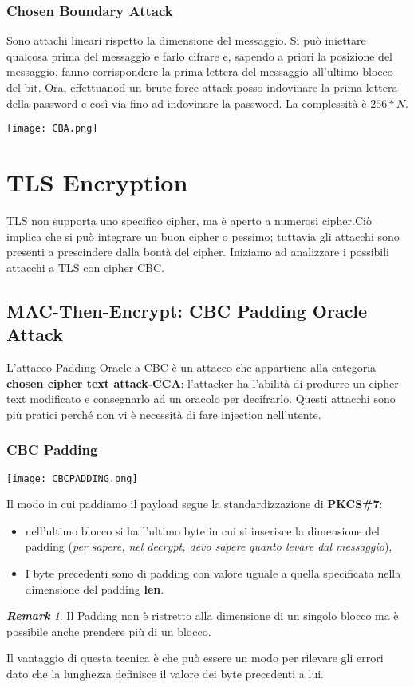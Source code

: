 \documentclass{article}
\theoremstyle{remark}
\newtheorem*{remark}{\textbf{Remark}}
\begin{document}
\subsubsection{Chosen Boundary Attack}
Sono attachi lineari rispetto la dimensione del messaggio. Si può iniettare qualcosa prima del messaggio e farlo cifrare e, sapendo a priori la posizione del messaggio, fanno corrispondere la prima lettera del messaggio all'ultimo blocco del bit. Ora, effettuanod un brute force attack posso indovinare la prima lettera della password e così via fino ad indovinare la password. La complessità è $256*N$.
\begin{center}
	\texttt{[image: CBA.png]}
\end{center}
\section{TLS Encryption}
TLS non supporta uno specifico cipher, ma è aperto a numerosi cipher.Ciò implica che si può integrare un buon cipher o pessimo; tuttavia gli attacchi sono presenti a prescindere dalla bontà del cipher. \newline
Iniziamo ad analizzare i possibili attacchi a TLS con cipher CBC.
\subsection{MAC-Then-Encrypt: CBC Padding Oracle Attack}
L'attacco Padding Oracle a CBC è un attacco che appartiene alla categoria \textbf{chosen cipher text attack-CCA}: l'attacker ha l'abilità di produrre un cipher text modificato e consegnarlo ad un oracolo per decifrarlo. Questi attacchi sono più pratici perché non vi è necessità di fare injection nell'utente.
\subsubsection{CBC Padding}
\begin{center}
	\texttt{[image: CBCPADDING.png]}
\end{center}
Il modo in cui paddiamo il payload segue la standardizzazione di \textbf{ PKCS\#7}:
\begin{itemize}
	\item nell'ultimo blocco si ha l'ultimo byte in cui si inserisce la dimensione del padding (\emph{per sapere, nel decrypt, devo sapere quanto levare dal messaggio}),
	\item I byte precedenti sono di padding con valore uguale a quella specificata nella dimensione del padding \textbf{len}.
\end{itemize}
\begin{remark}
	Il Padding non è ristretto alla dimensione di un singolo blocco ma è possibile anche prendere più di un blocco.
\end{remark}
Il vantaggio di questa tecnica è che può essere un modo per rilevare gli errori dato che la lunghezza definisce il valore dei byte precedenti a lui.
\end{document}
